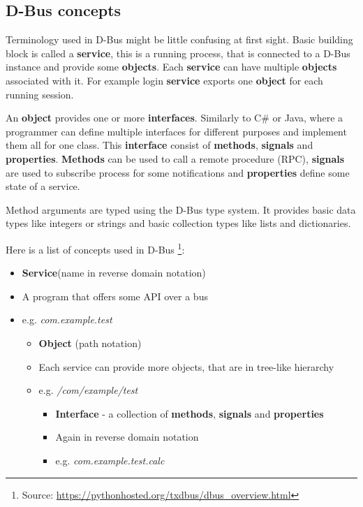 \documentclass[a4paper,10.5pt]{article}
\begin{document}
\subsection{D-Bus concepts}

Terminology used in D-Bus might be little confusing at first sight. Basic building block is called a \textbf{service}, this is a running process, that is connected to a D-Bus instance and provide some \textbf{objects}. Each \textbf{service} can have multiple \textbf{objects} associated with it. For example login \textbf{service} exports one \textbf{object} for each running session.

An \textbf{object} provides one or more \textbf{interfaces}. Similarly to C\# or Java, where a programmer can define multiple interfaces for different purposes and implement them all for one class. This \textbf{interface} consist of \textbf{methods}, \textbf{signals} and \textbf{properties}. \textbf{Methods} can be used to call a remote procedure (RPC), \textbf{signals} are used to subscribe process for some notifications and \textbf{properties} define some state of a service.

Method arguments are typed using the D-Bus type system. It provides basic data types like integers or strings and basic collection types like lists and dictionaries.

Here is a list of concepts used in D-Bus \footnote{Source: \url{https://pythonhosted.org/txdbus/dbus\_overview.html}}:

\begin{itemize}
    \item \textbf{Service}(name in reverse domain notation)
    \item A program that offers some API over a bus
    \item e.g. \textit{com.example.test}
    \begin{itemize}
      \item \textbf{Object} (path notation)
      \item Each service can provide more objects, that are in tree-like hierarchy
      \item e.g. \textit{/com/example/test}
      \begin{itemize}
        \item \textbf{Interface} - a collection of \textbf{methods}, \textbf{signals} and \textbf{properties}
        \item Again in reverse domain notation
        \item e.g. \textit{com.example.test.calc}
      \end{itemize}
    \end{itemize}
  \end{itemize}
  
\end{document}

